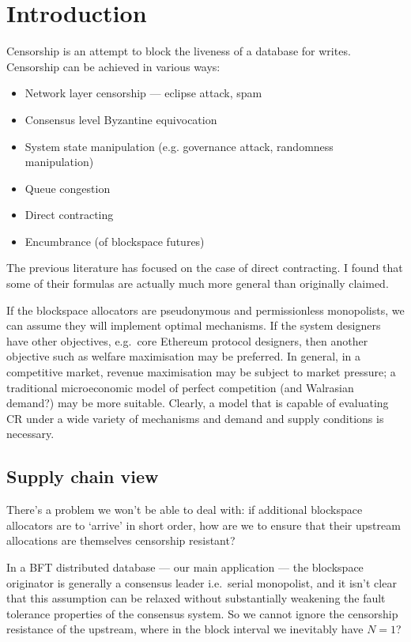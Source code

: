\maketitle
\section{Introduction}

Censorship is an attempt to block the liveness of a database for writes.
%
Censorship can be achieved in various ways:
\begin{itemize}
  \item Network layer censorship --- eclipse attack, spam
  \item Consensus level Byzantine equivocation
  \item System state manipulation (e.g. governance attack, randomness manipulation)
  \item Queue congestion
  \item Direct contracting
  \item Encumbrance (of blockspace futures)
\end{itemize}
%
The previous literature \cite{FPR} has focused on the case of direct contracting.
%
I found that some of their formulas are actually much more general than originally claimed.

If the blockspace allocators are pseudonymous and permissionless monopolists, we can assume they will implement optimal mechanisms.
%
If the system designers have other objectives, e.g.~core Ethereum protocol designers, then another objective such as welfare maximisation may be preferred.
%
In general, in a competitive market, revenue maximisation may be subject to market pressure; a traditional microeconomic model of perfect competition (and Walrasian demand?) may be more suitable.
%
Clearly, a model that is capable of evaluating CR under a wide variety of mechanisms and demand and supply conditions is necessary.

\subsection{Supply chain view}

There's a problem we won't be able to deal with: if additional blockspace allocators are to `arrive' in short order, how are we to ensure that their upstream allocations are themselves censorship resistant?

In a BFT distributed database --- our main application --- the blockspace originator is generally a consensus leader i.e.~serial monopolist, and it isn't clear that this assumption can be relaxed without substantially weakening the fault tolerance properties of the consensus system.
%
So we cannot ignore the censorship resistance of the upstream, where in the block interval we inevitably have $N=1$?

